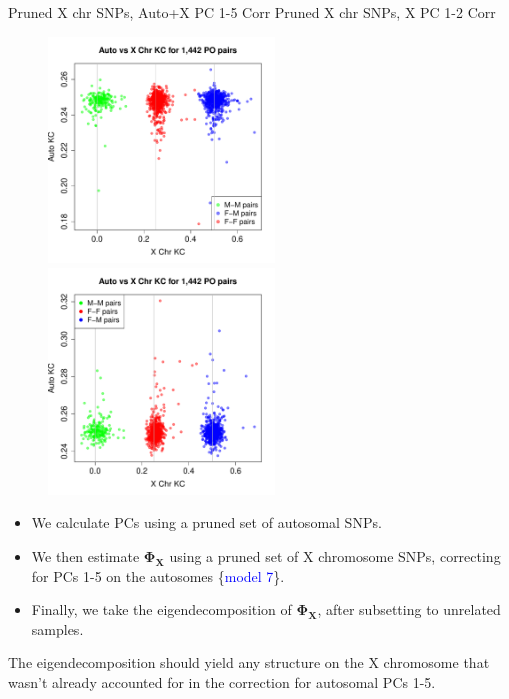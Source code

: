 \documentclass{beamer}
\begin{document}
\begin{frame}
\footnotesize
Pruned X chr SNPs, Auto+X PC 1-5 Corr \hspace{0.16cm} Pruned X chr SNPs, X PC 1-2 Corr
\centering
\begin{figure}
\includegraphics[height=6cm]{../kc_xPrunedvsAuto_poPairs_autoXAdj.pdf}
\includegraphics[height=6cm]{../kc_xPrunedvsAuto_poPairs_xAdj.pdf}
\end{figure}
\end{frame}



\begin{frame}
\begin{itemize}
\item We calculate PCs using a pruned set of autosomal SNPs.
\item We then estimate $\mathbf{\Phi_X}$ using a pruned set of X chromosome SNPs, correcting for PCs 1-5 on the autosomes \{\textcolor{blue}{model 7}\}.
\item Finally, we take the eigendecomposition of $\mathbf{\Phi_X}$, after subsetting to unrelated samples.
\end{itemize}
The eigendecomposition should yield any structure on the X chromosome that wasn't already accounted for in the correction for autosomal PCs 1-5.
\end{frame}
\end{document}

